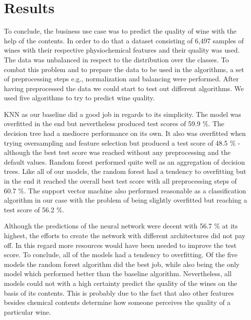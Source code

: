\chapter{Results}
To conclude, the business use case was to predict the quality of wine with the help of the contents. In order to do that a dataset consisting of 6,497 samples of wines with their respective physiochemical features and their quality was used. The data was unbalanced in respect to the distribution over the classes. To combat this problem and to prepare the data to be used in the algorithms, a set of preprocessing steps e.g., normalization and balancing were performed. After having preprocessed the data we could start to test out different algorithms. We used five algorithms to try to predict wine quality. 

KNN as our baseline did a good job in regards to its simplicity. The model was overfitted in the end but nevertheless produced test scores of 59.9 \%. The decision tree had a mediocre performance on its own. It also was overfitted when trying oversampling and feature selection but produced a test score of 48.5 \% - although the best test score was reached without any preprocessing and the default values. Random forest performed quite well as an aggregation of decision trees. Like all of our models, the random forest had a tendency to overfitting but in the end it reached the overall best test score with all preprocessing steps of 60.7 \%. The support vector machine also performed reasonable as a classification algorithm in our case with the problem of being slightly overfitted but reaching a test score of 56.2 \%.

Although the predictions of the neural network were decent with 56.7 \% at its highest, the efforts to create the network with different architectures did not pay off. In this regard more resources would have been needed to improve the test score. To conclude, all of the models had a tendency to overfitting.
Of the five models the random forest algorithm did the best job, while also being the only model which performed better than the baseline algorithm.
Nevertheless, all models could not with a high certainty predict the quality of the wines on the basis of its contents. This is probably due to the fact that also other features besides chemical contents determine how someone perceives the quality of a particular wine.